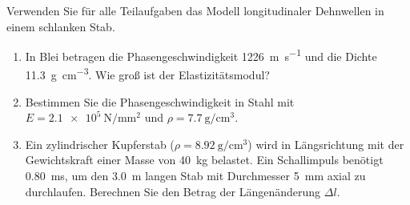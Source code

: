 \begin{ExerciseBlock}
Verwenden Sie für alle Teilaufgaben das Modell longitudinaler Dehnwellen in einem schlanken Stab.
\begin{enumerate}
\item In Blei betragen die Phasengeschwindigkeit \qty{1226}{\metre\per\second} und die Dichte \qty{11.3}{\gram\per\centi\metre\cubed}. Wie groß ist der Elastizitätsmodul?
\item Bestimmen Sie die Phasengeschwindigkeit in Stahl mit $E=\qty{2.1e5}{\newton\per\milli\metre\squared}$ und $\rho=\qty{7.7}{\gram\per\centi\metre\cubed}$.
\item Ein zylindrischer Kupferstab ($\rho=\qty{8.92}{\gram\per\centi\metre\cubed}$) wird in Längsrichtung mit der Gewichtskraft einer Masse von \qty{40}{\kilogram} belastet. Ein Schallimpuls benötigt \qty{0.80}{\milli\second}, um den \qty{3.0}{\metre} langen Stab mit Durchmesser \qty{5}{\milli\metre} axial zu durchlaufen. Berechnen Sie den Betrag der Längenänderung $\Delta l$.
\end{enumerate}
\end{ExerciseBlock}
